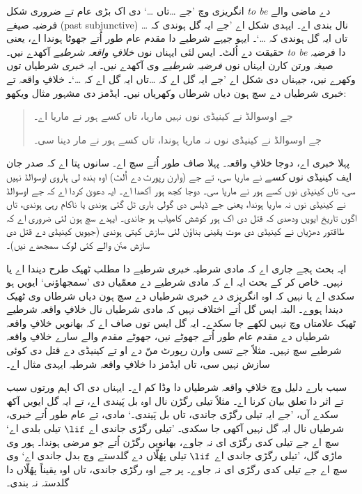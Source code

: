 \documentclass[../../../include/open-logic-section]{subfiles}
\begin{document}


انگریزی وچ ’جے \dots تاں \dots‘ دی اک بڑی عام تے ضروری شکل
\emph{to be} دے ماضی والے فرضیہ صیغے (past subjunctive) نال بندی اے۔
ایہدی شکل اے ’جے ایہ گل ہوندی کہ \dots تاں ایہ گل ہوندی کہ \dots‘۔
ایہو جیہے شرطیے دا مقدم عام طور اُتے جھوٹا ہوندا اے، یعنی حقیقت دے اُلٹ۔
ایس لئی ایہناں نوں \emph{خلافِ واقعہ شرطیے} آکھدے نیں۔ \emph{to be}
دا فرضیہ صیغہ ورتن کارن ایہناں نوں \emph{فرضیہ شرطیے} وی آکھدے نیں۔
ایہ \emph{خبری} شرطیاں توں وکھرے نیں، جیہناں دی شکل اے ’جے ایہ گل اے
کہ \dots تاں ایہ گل اے کہ \dots‘۔ خلافِ واقعہ تے خبری شرطیاں دے سچ
ہون دیاں شرطاں وکھریاں نیں۔ ایڈمز دی مشہور مثال ویکھو:
\begin{quote}
  جے اوسوالڈ نے کینیڈی نوں نہیں ماریا، تاں کسے ہور نے ماریا اے۔

  جے اوسوالڈ نے کینیڈی نوں نہ ماریا ہوندا، تاں کسے ہور نے مار دینا سی۔
\end{quote}
پہلا خبری اے، دوجا خلافِ واقعہ۔ پہلا صاف طور اُتے سچ اے۔ سانوں پتا اے
کہ صدر جان ایف کینیڈی نوں \emph{کسے} نے ماریا سی، تے جے (وارن رپورٹ دے اُلٹ)
اوہ بندہ لی ہاروی اوسوالڈ نہیں سی، تاں کینیڈی نوں کسے ہور نے ماریا سی۔
دوجا کجھ ہور آکھدا اے۔ ایہ دعویٰ کردا اے کہ جے اوسوالڈ نے کینیڈی نوں نہ
ماریا ہوندا، یعنی جے ڈیلس دی گولی باری ٹل گئی ہوندی یا ناکام رہی ہوندی،
تاں اگوں تاریخ ایویں ودھدی کہ قتل دی اک ہور کوشش کامیاب ہو جاندی۔
ایہدے سچ ہون لئی ضروری اے کہ طاقتور دھڑیاں نے کینیڈی دی موت یقینی بناؤن
لئی سازش کیتی ہوندی (جیویں کینیڈی دے قتل دی سازش منّن والے کئی لوک
سمجھدے نیں)۔

ایہ بحث ہجے جاری اے کہ مادی شرطیہ \emph{خبری} شرطیے دا مطلب ٹھیک طرح
دیندا اے یا نہیں۔ خاص کر کے بحث ایہ اے کہ مادی شرطیے دے معمّیاں دی
’سمجھاؤنی‘ ایویں ہو سکدی اے یا نہیں کہ اوہ انگریزی دے خبری شرطیاں دے
سچ ہون دیاں شرطاں وی ٹھیک دیندا ہووے۔ البتہ ایس گل اُتے اختلاف نہیں کہ
مادی شرطیاں نال خلافِ واقعہ شرطیے ٹھیک علامتاں وچ نہیں لکھے جا سکدے۔
ایہ گل ایس توں صاف اے کہ بھانویں خلافِ واقعہ شرطیاں دے مقدم عام طور اُتے
جھوٹے نیں، جھوٹے مقدم والے سارے خلافِ واقعہ شرطیے سچ نہیں۔ مثلاً جے تسی
وارن رپورٹ منّ دے او تے کینیڈی دے قتل دی کوئی سازش نہیں سی، تاں ایڈمز دا
خلافِ واقعہ شرطیہ ایہدی مثال اے۔

سبب بارے دلیل وچ خلافِ واقعہ شرطیاں دا وڈا کم اے۔ ایہناں دی اک
اہم ورتوں سبب تے اثر دا تعلق بیان کرنا اے۔ مثلاً تیلی رگڑن نال اوہ بل پَیندی اے،
تے ایہ گل ایویں آکھ سکدے آں، ’جے ایہ تیلی رگڑی جاندی، تاں بل پَیندی۔‘
مادی، تے عام طور اُتے خبری، شرطیاں نال ایہ گل نہیں آکھی جا سکدی۔
’تیلی رگڑی جاندی اے $\lif$ تیلی بلدی اے‘ سچ اے جے تیلی کدی رگڑی
ای نہ جاوے، بھانویں رگڑن اُتے جو مرضی ہوندا۔ ہور وی ماڑی گل، ’تیلی رگڑی
جاندی اے $\lif$ تیلی پھُلّاں دے گلدستے وچ بدل جاندی اے‘ وی سچ اے جے
تیلی کدی رگڑی ای نہ جاوے۔ پر جے اوہ رگڑی جاندی، تاں اوہ یقیناً پھُلّاں
دا گلدستہ نہ بندی۔
\end{document}
